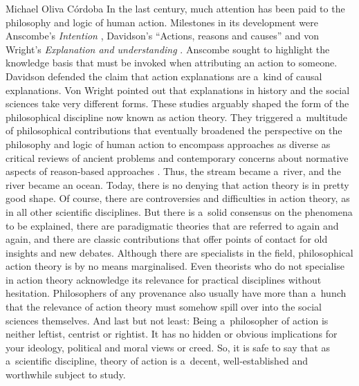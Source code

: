 \begin{artengenv}{Michael Oliva Córdoba}
\lettrine[loversize=0.13,lines=2,lraise=-0.03,nindent=0em,findent=0.2pt]%
{I}{}n the last century, much attention has been paid to the philosophy and logic of human action. Milestones in its development were Anscombe's \textit{Intention} 
\parencite*[][]{anscombe_intention_1957}, %
 Davidson's ``Actions, reasons and causes'' 
\parencite*[][]{davidson_1963} %
 and von Wright's \textit{Explanation and understanding} 
\parencite*[][]{wright_explanation_1971}. %
 Anscombe sought to highlight the knowledge basis that must be invoked when attributing an action to someone. Davidson defended the claim that action explanations are a~kind of causal explanations. Von Wright pointed out that explanations in history and the social sciences take very different forms. These studies arguably shaped the form of the philosophical discipline now known as action theory. They triggered a~multitude of philosophical contributions that eventually broadened the perspective on the philosophy and logic of human action to encompass approaches as diverse as critical reviews of ancient problems 
\parencites[such as the problem of weakness of will, cf., e.g.,][]{mele_weakness_2010}[][]{walker_problem_1989}[][]{davidson_actions_2001} %
 and contemporary concerns about normative aspects of reason-based approaches 
\parencites[such as patient autonomy in medical ethics and related problems, cf., e.g.,][]{zambrano_patient_2017}[][]{flanigan_obstetric_2016}[][]{jennings_agency_2009}. %
 Thus, the stream became a~river, and the river became an ocean. Today, there is no denying that action theory is in pretty good shape. Of course, there are controversies and difficulties in action theory, as in all other scientific disciplines. But there is a~solid consensus on the phenomena to be explained, there are paradigmatic theories that are referred to again and again, and there are classic contributions that offer points of contact for old insights and new debates. Although there are specialists in the field, philosophical action theory is by no means marginalised. Even theorists who do not specialise in action theory acknowledge its relevance for practical disciplines without hesitation. Philosophers of any provenance also usually have more than a~hunch that the relevance of action theory must somehow spill over into the social sciences themselves. And last but not least: Being a~philosopher of action is neither leftist, centrist or rightist. It has no hidden or obvious implications for your ideology, political and moral views or creed. So, it is safe to say that as a~scientific discipline, theory of action is a~decent, well-established and worthwhile subject to study.




\end{artengenv}
